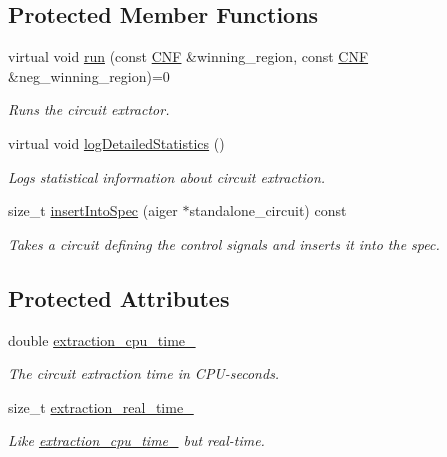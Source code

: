 \subsection*{Protected Member Functions}
\begin{DoxyCompactItemize}
\item 
virtual void \hyperlink{classCNFImplExtractor_a8251ce58869f9f8ded159f1fa07ab334}{run} (const \hyperlink{classCNF}{C\-N\-F} \&winning\-\_\-region, const \hyperlink{classCNF}{C\-N\-F} \&neg\-\_\-winning\-\_\-region)=0
\begin{DoxyCompactList}\small\item\em Runs the circuit extractor. \end{DoxyCompactList}\item 
virtual void \hyperlink{classCNFImplExtractor_abe790c767f6c71a52ef8b0a61ab39eaa}{log\-Detailed\-Statistics} ()
\begin{DoxyCompactList}\small\item\em Logs statistical information about circuit extraction. \end{DoxyCompactList}\item 
size\-\_\-t \hyperlink{classCNFImplExtractor_a0970602635f3356712d57ebb28d12c0d}{insert\-Into\-Spec} (aiger $\ast$standalone\-\_\-circuit) const 
\begin{DoxyCompactList}\small\item\em Takes a circuit defining the control signals and inserts it into the spec. \end{DoxyCompactList}\end{DoxyCompactItemize}
\subsection*{Protected Attributes}
\begin{DoxyCompactItemize}
\item 
double \hyperlink{classCNFImplExtractor_ab8be06d42fd3c4b569ec22cfcf2f508e}{extraction\-\_\-cpu\-\_\-time\-\_\-}
\begin{DoxyCompactList}\small\item\em The circuit extraction time in C\-P\-U-\/seconds. \end{DoxyCompactList}\item 
size\-\_\-t \hyperlink{classCNFImplExtractor_ae06413cf08f868357d64545b3041aa18}{extraction\-\_\-real\-\_\-time\-\_\-}
\begin{DoxyCompactList}\small\item\em Like \hyperlink{classCNFImplExtractor_ab8be06d42fd3c4b569ec22cfcf2f508e}{extraction\-\_\-cpu\-\_\-time\-\_\-} but real-\/time. \end{DoxyCompactList}\end{DoxyCompactItemize}
